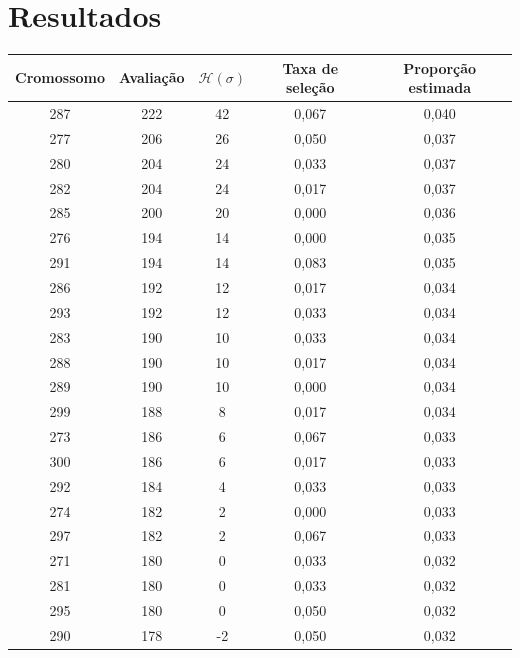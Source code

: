 
\chapter{Resultados}
\label{chap:anexos}

\begin{table}[h!]
	\begin{tabular}{|c|c|c|c|c|}
		\hline
		\textbf{Cromossomo} 	& \textbf{Avaliação} 	& \textbf{\(\mathcal{H}(\sigma) \)}	& \textbf{Taxa de seleção}	& \textbf{Proporção estimada} \\
		\hline
		287	&  222	&  42 	&  0,067	&  0,040 \\ \hline 
		277	&  206	&  26 	&  0,050	&  0,037 \\ \hline 
		280	&  204	&  24 	&  0,033	&  0,037 \\ \hline 
		282	&  204	&  24 	&  0,017	&  0,037 \\ \hline 
		285	&  200	&  20 	&  0,000	&  0,036 \\ \hline 
		276	&  194	&  14 	&  0,000	&  0,035 \\ \hline 
		291	&  194	&  14 	&  0,083	&  0,035 \\ \hline 
		286	&  192	&  12 	&  0,017	&  0,034 \\ \hline 
		293	&  192	&  12 	&  0,033	&  0,034 \\ \hline 
		283	&  190	&  10 	&  0,033	&  0,034 \\ \hline 
		288	&  190	&  10 	&  0,017	&  0,034 \\ \hline 
		289	&  190	&  10 	&  0,000	&  0,034 \\ \hline 
		299	&  188	&  8 	&  0,017	&  0,034 \\ \hline 
		273	&  186	&  6 	&  0,067	&  0,033 \\ \hline 
		300	&  186	&  6 	&  0,017	&  0,033 \\ \hline 
		292	&  184	&  4 	&  0,033	&  0,033 \\ \hline 
		274	&  182	&  2 	&  0,000	&  0,033 \\ \hline 
		297	&  182	&  2 	&  0,067	&  0,033 \\ \hline 
		271	&  180	&  0 	&  0,033	&  0,032 \\ \hline 
		281	&  180	&  0 	&  0,033	&  0,032 \\ \hline 
		295	&  180	&  0 	&  0,050	&  0,032 \\ \hline 
		290	&  178	&  -2 	&  0,050	&  0,032 \\ \hline 

\end{tabular}
\end{table}

